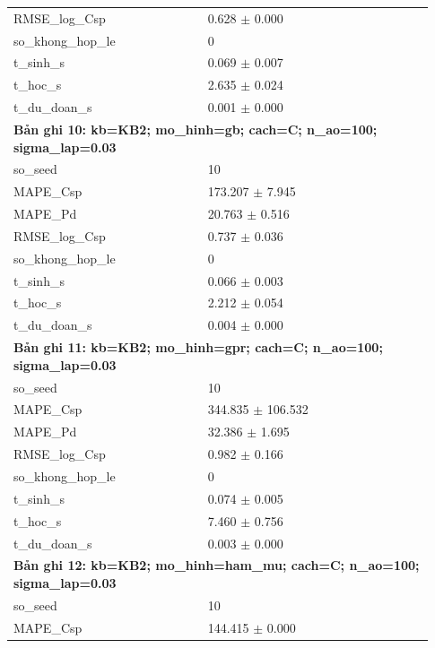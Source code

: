 \begin{longtable}{p{0.43\linewidth}p{0.50\linewidth}}
RMSE\_\allowbreak log\_\allowbreak Csp & 0.628 $\pm$ 0.000 \\
so\_\allowbreak khong\_\allowbreak hop\_\allowbreak le & 0 \\
t\_\allowbreak sinh\_\allowbreak s & 0.069 $\pm$ 0.007 \\
t\_\allowbreak hoc\_\allowbreak s & 2.635 $\pm$ 0.024 \\
t\_\allowbreak du\_\allowbreak doan\_\allowbreak s & 0.001 $\pm$ 0.000 \\
\midrule
\multicolumn{2}{p{0.95\linewidth}}{\textbf{Bản ghi 10: kb=KB2; mo\_hinh=gb; cach=C; n\_ao=100; sigma\_lap=0.03}} \\
so\_\allowbreak seed & 10 \\
MAPE\_\allowbreak Csp & 173.207 $\pm$ 7.945 \\
MAPE\_\allowbreak Pd & 20.763 $\pm$ 0.516 \\
RMSE\_\allowbreak log\_\allowbreak Csp & 0.737 $\pm$ 0.036 \\
so\_\allowbreak khong\_\allowbreak hop\_\allowbreak le & 0 \\
t\_\allowbreak sinh\_\allowbreak s & 0.066 $\pm$ 0.003 \\
t\_\allowbreak hoc\_\allowbreak s & 2.212 $\pm$ 0.054 \\
t\_\allowbreak du\_\allowbreak doan\_\allowbreak s & 0.004 $\pm$ 0.000 \\
\midrule
\multicolumn{2}{p{0.95\linewidth}}{\textbf{Bản ghi 11: kb=KB2; mo\_hinh=gpr; cach=C; n\_ao=100; sigma\_lap=0.03}} \\
so\_\allowbreak seed & 10 \\
MAPE\_\allowbreak Csp & 344.835 $\pm$ 106.532 \\
MAPE\_\allowbreak Pd & 32.386 $\pm$ 1.695 \\
RMSE\_\allowbreak log\_\allowbreak Csp & 0.982 $\pm$ 0.166 \\
so\_\allowbreak khong\_\allowbreak hop\_\allowbreak le & 0 \\
t\_\allowbreak sinh\_\allowbreak s & 0.074 $\pm$ 0.005 \\
t\_\allowbreak hoc\_\allowbreak s & 7.460 $\pm$ 0.756 \\
t\_\allowbreak du\_\allowbreak doan\_\allowbreak s & 0.003 $\pm$ 0.000 \\
\midrule
\multicolumn{2}{p{0.95\linewidth}}{\textbf{Bản ghi 12: kb=KB2; mo\_hinh=ham\_mu; cach=C; n\_ao=100; sigma\_lap=0.03}} \\
so\_\allowbreak seed & 10 \\
MAPE\_\allowbreak Csp & 144.415 $\pm$ 0.000 \\

\end{longtable}

